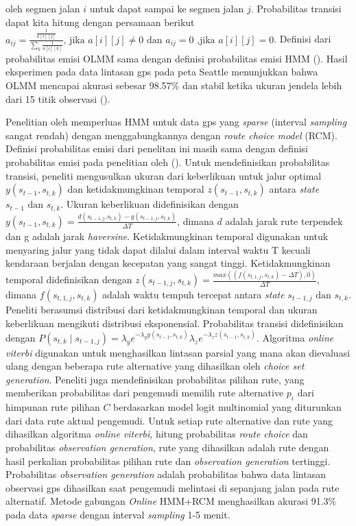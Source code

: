 oleh segmen jalan $i$ untuk dapat sampai ke segmen jalan $j$. Probabilitas transisi dapat kita hitung dengan persamaan berikut $a_{ij}=\frac{\frac{1}{a[i][j]}}{\sum_{k}\frac{1}{a[i][k]}} \text{, jika } a[i][j] \neq 0 \text{ dan } a_{ij}=0 \text{ ,jika } a[i][j] = 0$. Definisi dari probabilitas emisi OLMM sama dengan definisi probabilitas emisi HMM (\cite{Krumm2009}). Hasil eksperimen pada data lintasan gps pada peta Seattle menunjukkan bahwa OLMM mencapai akurasi sebesar 98.57\% dan stabil ketika ukuran jendela lebih dari 15 titik observasi (\cite{Liang2016}).


Penelitian oleh \cite{Jagadeesh2017} memperluas HMM untuk data gps yang \textit{sparse} (interval \textit{sampling} sangat rendah) dengan menggabungkannya dengan \textit{route choice model} (RCM). Definisi probabilitas emisi dari penelitan ini masih sama dengan definisi probabilitas emisi pada penelitian oleh (\cite{Krumm2009}). Untuk mendefinisikan probabilitas transisi, peneliti mengusulkan ukuran dari keberlikuan untuk jalur optimal $y(s_{t-1}, s_{t,k})$ dan ketidakmungkinan temporal $z(s_{t-1}, s_{t,k})$ antara \textit{state} $s_{t-1} \text{ dan } s_{t,k}$. Ukuran keberlikuan didefinisikan dengan $y(s_{t-1}, s_{t,k})=\frac{d(s_{t-1,j}. s_{t,k})-g(s_{t-1,j},s_{t,k})}{\Delta T}$, dimana $d$ adalah jarak rute terpendek dan g adalah jarak \textit{haversine}. Ketidakmungkinan temporal digunakan untuk menyaring jalur yang tidak dapat dilalui dalam interval waktu T kecuali kendaraan berjalan dengan kecepatan yang sangat tinggi. Ketidakmungkinan temporal didefinisikan dengan $z(s_{t-1,j}, s_{t,k})=\frac{max((f(s_{t,1,j}, s_{t,k}) - \Delta T), 0)}{\Delta T}$, dimana $f(s_{t,1,j}, s_{t,k}) $ adalah waktu tempuh tercepat antara \textit{state} $s_{t-1,j} \text{ dan } s_{t,k}$. Peneliti berasumsi distribusi dari ketidakmungkinan temporal dan ukuran keberlikuan mengikuti distribusi eksponensial. Probabilitas transisi didefinisikan dengan $P(s_{t,k}\mid s_{t-1,j})=\lambda_y e^{-\lambda_y y(s_{t-1}, s_{t,k})} \lambda_z e^{-\lambda_z z(s_{t-1}, s_{t,k})}$. Algoritma \textit{online viterbi} digunakan untuk menghasilkan lintasan parsial yang mana akan dievaluasi ulang dengan beberapa rute alternative yang dihasilkan oleh \textit{choice set generation}. Peneliti juga mendefinisikan probabilitas pilihan rute, yang memberikan probabilitas dari pengemudi memilih rute alternative $p_i$ dari himpunan rute pilihan $C$ berdasarkan model logit multinomial yang diturunkan dari data rute aktual pengemudi. Untuk setiap rute alternative dan rute yang dihasilkan algoritma \textit{online viterbi}, hitung probabilitas \textit{route choice} dan probabilitas \textit{observation generation}, rute yang dihasilkan adalah rute dengan hasil perkalian probabilitas pilihan rute dan \textit{observation generation} tertinggi. Probabilitas \textit{observation generation} adalah probabilitas bahwa data lintasan observasi gps dihasilkan saat pengemudi melintasi di sepanjang jalan pada rute alternatif. Metode gabungan \textit{Online} HMM+RCM menghasilkan akurasi 91.3\% pada data \textit{sparse} dengan interval \textit{sampling} 1-5 menit.


